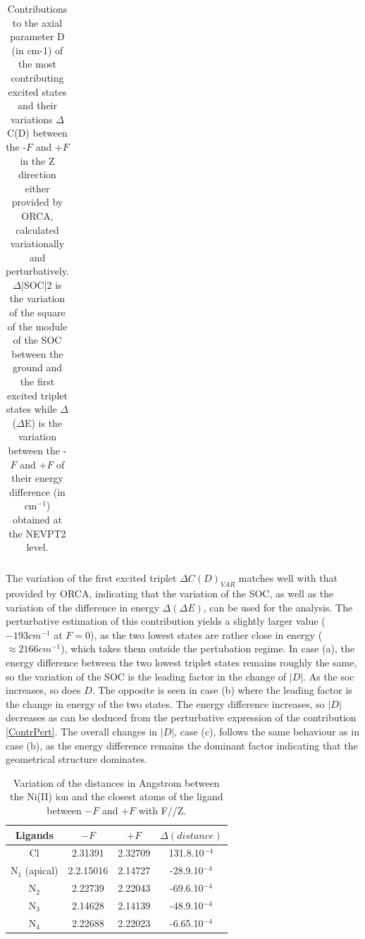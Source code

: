 \documentclass[10pt]{report}
\numberwithin{equation}{section}
\begin{document}
\begin{table}[h]
{\begin{tabular}{c | c | c  c | c c c |c |c}
    \hline
    \end{tabular}
    }
    \caption{Contributions to the axial parameter D (in cm-1) of the most contributing excited states and their variations $\Delta$C(D) between the -$F$ and +$F$ in the Z direction either provided by ORCA, calculated variationally and perturbatively. $\Delta$|SOC|2 is the variation of the square of the module of the SOC between the ground and the first excited triplet states while $\Delta$($\Delta$E) is the variation between the -$F$ and +$F$ of their energy difference (in cm$^{-1}$) obtained at the NEVPT2 level.}
    \label{tab:Contribution_Z}
\end{table}

The variation of the first excited triplet $\Delta C(D)_{VAR}$ matches well with that provided by ORCA, indicating that the variation of the SOC, as well as the variation of the difference in energy $\Delta (\Delta E)$, can be used for the analysis.
The perturbative estimation of this contribution yields a slightly larger value ($-193 cm^{-1}$ at $F=0$), as the two lowest states are rather close in energy ($\approx 2166 cm^{-1}$), which takes them outside the pertubation regime.
In case (a), the energy difference between the two lowest triplet states remains roughly the same, so the variation of the SOC is the leading factor in the change of $|D|$. As the soc increases, so does $D$.
The opposite is seen in case (b) where the leading factor is the change in energy of the two states. 
The energy difference increases, so $|D|$ decreases as can be deduced from the perturbative expression of the contribution \ref{ContrPert}.
The overall changes in $|D|$, case (c), follows the same behaviour as in case (b), as the energy difference remains the dominant factor indicating that the geometrical structure dominates.
\begin{table}[!ht]
    \centering
    \begin{tabular}{| c | c| c | c |}
        \hline
        Ligands & $-F$ & $+F$ &$\Delta(distance)$\\
        \hline
        Cl & 2.31391& 2.32709&  131.8.10$^{-4}$\\
        N$_1$ (apical) & 2.2.15016  & 2.14727 &-28.9.10$^{-4}$\\
        N$_2$ & 2.22739 & 2.22043&-69.6.10$^{-4}$ \\
        N$_3$ & 2.14628& 2.14139&-48.9.10$^{-4}$ \\
        N$_4$ & 2.22688 & 2.22023 &-6.65.10$^{-4}$\\
        \hline
    \end{tabular}
    \caption{Variation of the distances in Angstrom between the Ni(II) ion and the closest atoms of the ligand between $-F$ and $+F$ with F//Z.}
    \label{tab:DistanceZ}
\end{table}
\end{document}
